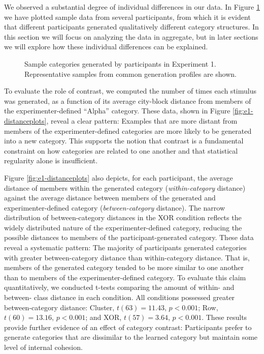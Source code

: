 \documentclass[12pt]{article}
\newcommand\inputpgf[2]{{
\let\pgfimageWithoutPath\pgfimage
\renewcommand{\pgfimage}[2][]{\pgfimageWithoutPath[##1]{#1/##2}}

}}
\begin{document}
\begin{flushleft}
We observed a substantial degree of individual differences in our data. In
Figure \ref{fig:e1-samples} we have plotted sample data from several
participants, from which it is evident that different participants generated
qualitatively different category structures. In this section we will focus on
analyzing the data in aggregate, but in later sections we will explore how these
individual differences can be explained.

\begin{figure}
    \begin{center} \inputpgf{figs/}{e1-samples.pgf}
    \caption{Sample categories generated by participants in Experiment 1.
Representative samples from common generation profiles are shown.}
    \label{fig:e1-samples}
    \end{center}
\end{figure}

To evaluate the role of contrast, we computed the number of times each stimulus
was generated, as a function of its average city-block distance from members of
the experimenter-defined ``Alpha'' category. These data, shown in Figure
\ref{fig:e1-distanceplots}, reveal a clear pattern: Examples that are more
distant from members of the experimenter-defined categories are more likely to
be generated into a new category. This supports the notion that contrast is a
fundamental constraint on how categories are related to one another and that statistical
regularity alone is insufficient.


Figure \ref{fig:e1-distanceplots} also depicts, for each participant, the
average distance of members within the generated category ({\em within-category}
distance) against the average distance between members of the generated and
experimenter-defined category ({\em between-category} distance). The narrow
distribution of between-category distances in the XOR condition reflects the
widely distributed nature of the experimenter-defined category, reducing the
possible distances to members of the participant-generated category. These data
reveal a systematic pattern: The majority of participants generated categories
with greater between-category distance than within-category distance. That is,
members of the generated category tended to be more similar to one another than
to members of the experimenter-defined category. To evaluate this claim
quantitatively, we conducted t-tests comparing the amount of within- and
between- class distance in each condition. All conditions possessed greater
between-category distance: Cluster, $t(63) = 11.43$, $p < 0.001$; Row, $t(60) =
13.16$, $p < 0.001$; and XOR, $t(57) = 3.64$, $p < 0.001$. These results provide
further evidence of an effect of category contrast: Participants prefer to
generate categories that are dissimilar to the learned category but maintain
some level of internal cohesion.


\end{flushleft}
\end{document}
